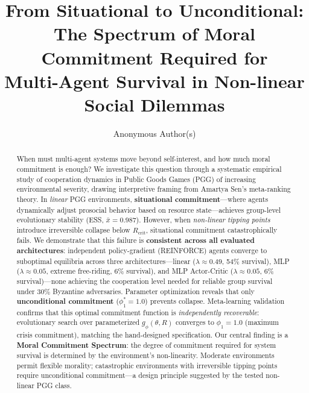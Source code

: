 \documentclass{article}
\title{From Situational to Unconditional:\\The Spectrum of Moral Commitment Required for\\Multi-Agent Survival in Non-linear Social Dilemmas}
\author{Anonymous Author(s)}
\begin{document}
\maketitle

\begin{abstract}
When must multi-agent systems move beyond self-interest, and how much moral commitment is enough?
We investigate this question through a systematic empirical study of cooperation dynamics in Public Goods Games (PGG) of increasing environmental severity, drawing interpretive framing from Amartya Sen's meta-ranking theory.
In \emph{linear} PGG environments, \textbf{situational commitment}---where agents dynamically adjust prosocial behavior based on resource state---achieves group-level evolutionary stability (ESS, $\bar{x}=0.987$).
However, when \emph{non-linear tipping points} introduce irreversible collapse below $R_{\text{crit}}$, situational commitment catastrophically fails.
We demonstrate that this failure is \textbf{consistent across all evaluated architectures}: independent policy-gradient (REINFORCE) agents converge to suboptimal equilibria across three architectures---linear ($\lambda \approx 0.49$, 54\% survival), MLP ($\lambda \approx 0.05$, extreme free-riding, 6\% survival), and MLP Actor-Critic ($\lambda \approx 0.05$, 6\% survival)---none achieving the cooperation level needed for reliable group survival under 30\% Byzantine adversaries.
Parameter optimization reveals that only \textbf{unconditional commitment} ($\phi_1^* = 1.0$) prevents collapse.
Meta-learning validation confirms that this optimal commitment function is \emph{independently recoverable}: evolutionary search over parameterized $g_\phi(\theta, R)$ converges to $\phi_1 = 1.0$ (maximum crisis commitment), matching the hand-designed specification.
Our central finding is a \textbf{Moral Commitment Spectrum}: the degree of commitment required for system survival is determined by the environment's non-linearity.
Moderate environments permit flexible morality; catastrophic environments with irreversible tipping points require unconditional commitment---a design principle suggested by the tested non-linear PGG class.
\end{abstract}

\end{document}
